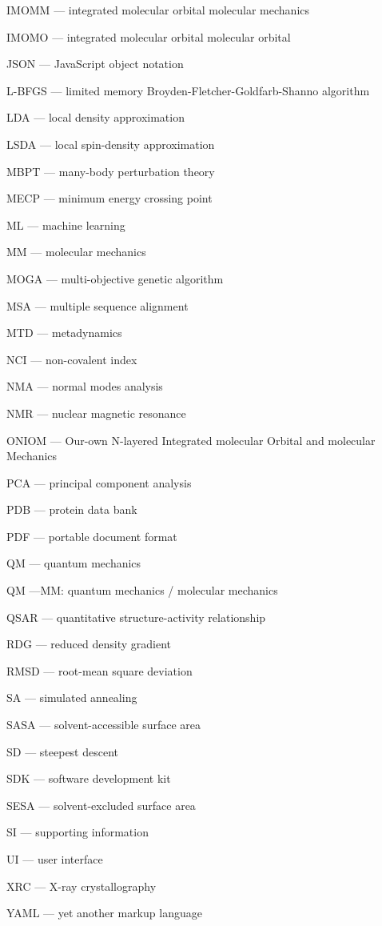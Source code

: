 \textsc{IMOMM} --- integrated molecular orbital molecular mechanics

\textsc{IMOMO} --- integrated molecular orbital molecular orbital

\textsc{JSON} --- JavaScript object notation

\textsc{L-BFGS} --- limited memory Broyden-Fletcher-Goldfarb-Shanno algorithm

\textsc{LDA} --- local density approximation

\textsc{LSDA} --- local spin-density approximation

\textsc{MBPT} --- many-body perturbation theory

\textsc{MECP} --- minimum energy crossing point

\textsc{ML} --- machine learning

\textsc{MM} --- molecular mechanics

\textsc{MOGA} --- multi-objective genetic algorithm

\textsc{MSA} --- multiple sequence alignment

\textsc{MTD} --- metadynamics

\textsc{NCI} --- non-covalent index

\textsc{NMA} --- normal modes analysis

\textsc{NMR} --- nuclear magnetic resonance

\textsc{ONIOM} --- Our-own N-layered Integrated molecular Orbital and molecular Mechanics

\textsc{PCA} --- principal component analysis

\textsc{PDB} --- protein data bank

\textsc{PDF} --- portable document format

\textsc{QM} --- quantum mechanics

\textsc{QM} ---MM: quantum mechanics / molecular mechanics

\textsc{QSAR} --- quantitative structure-activity relationship

\textsc{RDG} --- reduced density gradient

\textsc{RMSD} --- root-mean square deviation

\textsc{SA} --- simulated annealing

\textsc{SASA} --- solvent-accessible surface area

\textsc{SD} --- steepest descent

\textsc{SDK} --- software development kit

\textsc{SESA} --- solvent-excluded surface area

\textsc{SI} --- supporting information

\textsc{UI} --- user interface

\textsc{XRC} --- X-ray crystallography

\textsc{YAML} --- yet another markup language